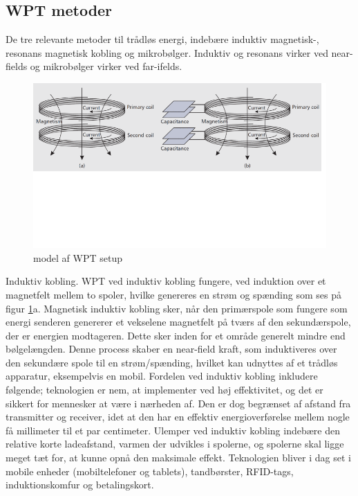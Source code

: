 \subsection{WPT metoder}
De tre relevante metoder til trådløs energi, indebære induktiv magnetisk-, resonans magnetisk kobling og mikrobølger. Induktiv og resonans virker ved near-fields og mikrobølger virker ved far-ifelds.

\begin{figure}[H]
\centering
\includegraphics[scale=0.5]{Vildledning/Schematics/induktiv_resonans}
\caption{model af WPT setup}
\label{figure:wptsetup}
\end{figure}

Induktiv kobling. 
WPT ved induktiv kobling fungere, ved induktion over et magnetfelt mellem to spoler, hvilke genereres en strøm og spænding som ses på figur \ref{figure:wptsetup}a. Magnetisk induktiv kobling sker, når den primærspole som fungere som energi senderen genererer et vekselene magnetfelt på tværs af den sekundærspole, der er energien modtageren. Dette sker inden for et område generelt mindre end bølgelængden. Denne process skaber en near-field kraft, som induktiveres over den sekundære spole til en strøm/spænding, hvilket kan udnyttes af et trådløs apparatur, eksempelvis en mobil. 
Fordelen ved induktiv kobling inkludere følgende; teknologien er nem, at implementer ved høj effektivitet, og det er sikkert for mennesker at være i nærheden af. Den er dog begrænset af afstand fra transmitter og receiver, idet at den har en effektiv energioverførelse mellem nogle få millimeter til et par centimeter. Ulemper ved induktiv kobling indebære den relative korte ladeafstand, varmen der udvikles i spolerne, og spolerne skal ligge meget tæt for, at kunne opnå den maksimale effekt.
Teknologien bliver i dag set i mobile enheder (mobiltelefoner og tablets), tandbørster, RFID-tags, induktionskomfur og betalingskort.

